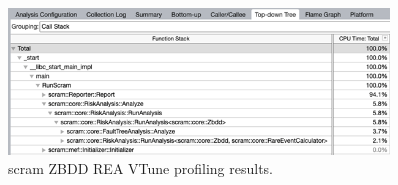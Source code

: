 \begin{figure}[H]
    \centering
    \includegraphics[width=0.9\textwidth]{3_identifying_gaps/benchmarking/profiling_methods/figures/vtune_scram_zbdd.png}
    \caption{scram ZBDD REA VTune profiling results.}
    \label{fig:vtune_scram_zbdd}
\end{figure}